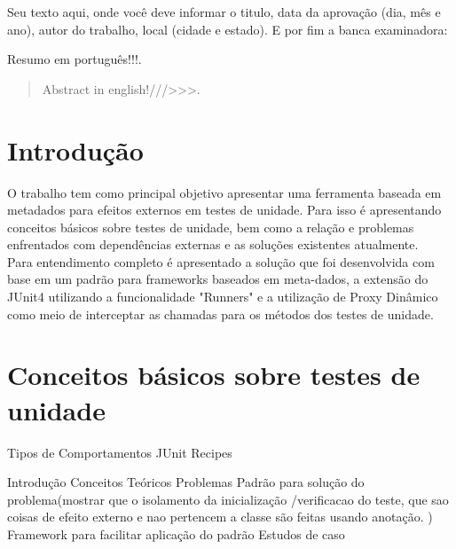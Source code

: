 \documentclass{abnt}
\begin{document}
\capa
\folhaderosto

\setlength{\ABNTsignthickness}{1pt}
\begin{folhadeaprovacao}
	Seu texto aqui, onde você deve informar o titulo, data da aprovação (dia, mês e ano), autor do trabalho, local (cidade e estado). E por fim a banca examinadora:
\end{folhadeaprovacao}

\begin{resumo}
	Resumo em português!!!.
\end{resumo}

\begin{abstract}
	Abstract in english!///>>>.
\end{abstract}

\sumario
\listoffigures

\chapter{Introdução} O trabalho tem como principal objetivo apresentar uma ferramenta baseada em metadados para efeitos externos em testes de unidade. Para isso é apresentando conceitos básicos sobre testes de unidade, bem como a relação e problemas enfrentados com dependências externas e as soluções existentes atualmente.\\
Para entendimento completo é apresentado a solução que foi desenvolvida com base em um padrão para frameworks baseados em meta-dados, a extensão do JUnit4 utilizando a funcionalidade "Runners" e a utilização de Proxy Dinâmico como meio de interceptar as chamadas para os métodos dos testes de unidade.\\

\chapter{Conceitos básicos sobre testes de unidade}

Tipos de Comportamentos
JUnit Recipes


Introdução
Conceitos Teóricos
Problemas
Padrão para solução do problema(mostrar que o isolamento da inicialização /verificacao do teste, que sao coisas de efeito externo e nao pertencem a classe são feitas  usando anotação. )
Framework para facilitar aplicação do padrão
Estudos de caso
\end{document}

